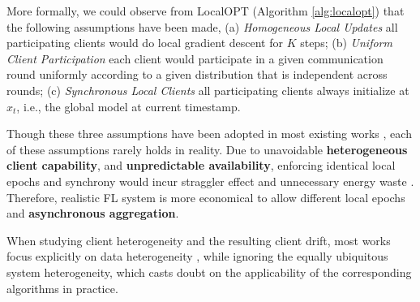 More formally, we could observe from LocalOPT (Algorithm \ref{alg:localopt}) that the following assumptions have been made, (a) \textit{Homogeneous Local Updates} all participating clients would do local gradient descent for $K$ steps; (b) \textit{Uniform Client Participation} each client would participate in a given communication round uniformly according to a given distribution that is independent across rounds; (c) \textit{Synchronous Local Clients} all participating clients always initialize at $x_t$, i.e., the global model at current timestamp. 



Though these three assumptions have been adopted in most existing works \citep{McMahan2017FedAvg,Hsu2019MeasuringTE,Li20FedProx,karimireddy2020scaffold,reddi2020adaptive,wang22adaptive, hu2023beyond}, each of these assumptions rarely holds in reality. Due to unavoidable \textbf{heterogeneous client capability}, and \textbf{unpredictable availability}, enforcing identical local epochs and synchrony would incur straggler effect and unnecessary energy waste \citep{Kairouz21AdvancesProblems}. Therefore, realistic FL system is more economical to allow different local epochs and \textbf{asynchronous aggregation}.


When studying client heterogeneity and the resulting client drift, most works focus explicitly on data heterogeneity \citep{Li2020Fed-Non-IID,yang2021achieving}, while ignoring the equally ubiquitous system heterogeneity, which casts doubt on the applicability of the corresponding algorithms in practice.

\iffalse


